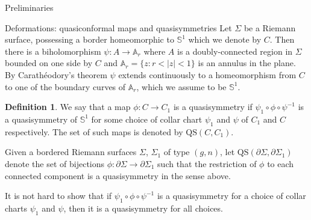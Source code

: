 \documentclass[12pt]{amsart}
\newcommand{\riem}{\Sigma}  %
\theoremstyle{plain}
\theoremstyle{definition}
\newtheorem{definition}[theorem]{Definition}
\theoremstyle{remark}
\numberwithin{equation}{section} %
\numberwithin{figure}{section} %
\begin{document}
\begin{section}{Preliminaries}
\begin{subsection}{Deformations: quasiconformal maps and quasisymmetries}
Let $\riem$ be a Riemann surface, possessing a border homeomorphic to $\mathbb{S}^1$ which we denote by $C$. Then there is a biholomorphism $\psi:A \rightarrow \mathbb{A}_r$ where $A$ is a doubly-connected region in $\riem$ bounded on one side by $C$ and $\mathbb{A}_r = \{z: r <|z|<1 \}$ is an annulus in the plane. By Carath\'eodory's theorem $\psi$ extends continuously to a homeomorphism from $C$ to one of the boundary curves of $\mathbb{A}_r$, which we assume to be $\mathbb{S}^1$.   
\begin{definition} \label{de:quasisymmetries_surfaces}
We say that a map $\phi:C \rightarrow C_1$ is a quasisymmetry if $\psi_1 \circ \phi \circ \psi^{-1}$ is a quasisymmetry of $\mathbb{S}^1$ for some choice of collar chart $\psi_1$ and $\psi$ of $C_1$ and $C$ respectively. The set of such maps is denoted by $\mathrm{QS}(C,C_1)$. 

Given a bordered Riemann surfaces $\riem$, $\riem_1$ of type $(g,n)$, let $\mathrm{QS}(\partial \riem,\partial \riem_1)$ denote the set of bijections $\phi:\partial \riem \rightarrow \partial \riem_1$ such that the restriction of $\phi$ to each connected component is a quasisymmetry in the sense above. 
\end{definition}

It is not hard to show that if $\psi_1 \circ \phi \circ \psi^{-1}$ is a quasisymmetry for a choice of collar charts $\psi_1$ and $\psi$, then it is a quasisymmetry for all choices. 
\end{subsection} 
\end{section}
\end{document}
